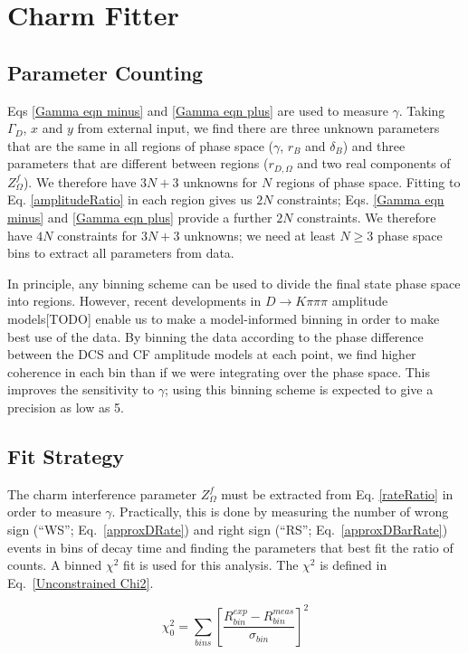 \documentclass[note.tex]{subfiles}
\begin{document}
\section{Charm Fitter}
\subsection{Parameter Counting}
\label{Parameter Counting}
Eqs \ref{Gamma eqn minus} and \ref{Gamma eqn plus} are used to measure $\gamma$.
Taking $\Gamma_D$, $x$ and $y$ from external input, we find there are three unknown parameters that are the same in all regions of phase space ($\gamma$, $r_B$ and $\delta_B$) and three parameters that are different between regions ($r_{D, \Omega}$ and two real components of $Z_\Omega^f$).
We therefore have $3N + 3$ unknowns for $N$ regions of phase space.
Fitting to Eq. \ref{amplitudeRatio} in each region gives us $2N$ constraints; Eqs. \ref{Gamma eqn minus} and \ref{Gamma eqn plus} provide a further $2N$ constraints.
We therefore have $4N$ constraints for $3N + 3$ unknowns; we need at least $N\geq 3$ phase space bins to extract all parameters from data.

In principle, any binning scheme can be used to divide the final state phase space into regions.
However, recent developments in $D\rightarrow K \pi \pi \pi$ amplitude models[TODO] enable us to make a model-informed binning in order to make best use of the data.
By binning the data according to the phase difference between the DCS and CF amplitude models at each point,
we find higher coherence in each bin than if we were integrating over the phase space.
This improves the sensitivity to $\gamma$; using this binning scheme is expected to give a precision as low as 5\degree[TODO].

\subsection{Fit Strategy}
The charm interference parameter $Z_\Omega^f$ must be extracted from Eq. \ref{rateRatio} in order to measure $\gamma$.
Practically, this is done by measuring the number of wrong sign (``WS''; Eq.~\ref{approxDRate}) and right sign (``RS''; Eq.~\ref{approxDBarRate})
events in bins of decay time and finding the parameters that best fit the ratio of counts.
A binned $\chi^2$ fit is used for this analysis. The $\chi^2$ is defined in Eq.~\ref{Unconstrained Chi2}.

\begin{equation}
    \chi^2_0 = \sum_{bins}\left[\frac{R^{exp}_{bin} - R^{meas}_{bin}}{\sigma_{bin}}\right]^2
    \label{Unconstrained Chi2}
\end{equation}
\end{document}
